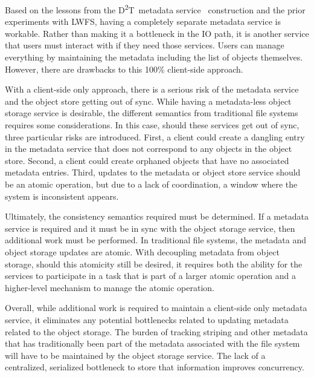 \documentclass[conference]{IEEEtran}
\newcommand{\DDT}{D\textsuperscript{2}T~}
\begin{document}
Based on the lessons from the \DDT metadata
service~\cite{lofstead:2012:txn-metadata} construction and the prior
experiments with LWFS, having a completely separate metadata service is
workable. Rather than making it a bottleneck in the IO path, it is another
service that users must interact with if they need those services.  Users can
manage everything by maintaining the metadata including the list of objects
themselves. However, there are drawbacks to this 100\% client-side approach.

With a client-side only approach, there is a serious risk of the metadata
service and the object store getting out of sync.  While having a metadata-less
object storage service is desirable, the different semantics from traditional
file systems requires some considerations. In this case, should these services
get out of sync, three particular risks are introduced.  First, a client could
create a dangling entry in the metadata service that does not correspond to any
objects in the object store. Second, a client could create orphaned objects
that have no associated metadata entries. Third, updates to the metadata or
object store service should be an atomic operation, but due to a lack of
coordination, a window where the system is inconsistent appears.

Ultimately, the consistency semantics required must be determined. If a
metadata service is required and it must be in sync with the object storage
service, then additional work must be performed. In traditional file systems,
the metadata and object storage updates are atomic. With decoupling metadata
from object storage, should this atomicity still be desired, it requires both
the ability for the services to participate in a task that is part of a larger
atomic operation and a higher-level mechanism to manage the atomic operation.

Overall, while additional work is required to maintain a client-side only
metadata service, it eliminates any potential bottlenecks related to updating
metadata related to the object storage. The burden of tracking striping and
other metadata that has traditionally been part of the metadata associated with
the file system will have to be maintained by the object storage service. The
lack of a centralized, serialized bottleneck to store that information improves
concurrency.
\end{document}
